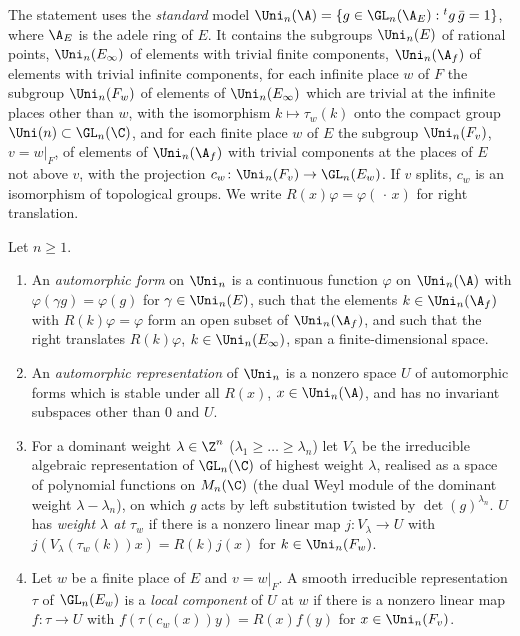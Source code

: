 The statement uses the \emph{standard} model $\Uni_n(\A)=\{g\in\GL_n(\A_E):{}^tg\,\bar g=1\}$, where $\A_E$ is
the adele ring of $E$. It contains the subgroups $\Uni_n(E)$ of rational points, $\Uni_n(E_\infty)$ of
elements with trivial finite components, $\Uni_n(\A_f)$ of elements with trivial infinite components,
for each infinite place $w$ of $F$ the subgroup $\Uni_n(F_w)$ of elements of $\Uni_n(E_\infty)$ which are
trivial at the infinite places other than $w$, with the isomorphism $k\mapsto\tau_w(k)$ onto the compact
group $\Uni(n)\subset\GL_n(\C)$, and for each finite place $w$ of $E$ the subgroup $\Uni_n(F_v)$,
$v=w|_F$, of elements of $\Uni_n(\A_f)$ with trivial components at the places of $E$ not above $v$, with
the projection $c_w\colon\Uni_n(F_v)\to\GL_n(E_w)$. If $v$ splits, $c_w$ is an isomorphism of
topological groups. We write $R(x)\varphi=\varphi(\,\cdot\,x)$ for right translation.

\begin{definition}\label{pf:tlift:aut}
Let $n\ge1$.
\begin{enumerate}[label=(\alph*),nosep]
\item An \emph{automorphic form} on $\Uni_n$ is a continuous function $\varphi$ on $\Uni_n(\A)$ with
  $\varphi(\gamma g)=\varphi(g)$ for $\gamma\in\Uni_n(E)$, such that the elements $k\in\Uni_n(\A_f)$ with
  $R(k)\varphi=\varphi$ form an open subset of $\Uni_n(\A_f)$, and such that the right translates
  $R(k)\varphi$, $k\in\Uni_n(E_\infty)$, span a finite-dimensional space.
\item An \emph{automorphic representation} of $\Uni_n$ is a nonzero space $U$ of automorphic forms which
  is stable under all $R(x)$, $x\in\Uni_n(\A)$, and has no invariant subspaces other than $0$ and $U$.
\item For a dominant weight $\lambda\in\Z^n$ ($\lambda_1\ge\dots\ge\lambda_n$) let $V_\lambda$ be the
  irreducible algebraic representation of $\GL_n(\C)$ of highest weight $\lambda$, realised as a
  space of polynomial functions on $M_n(\C)$ (the dual Weyl module of the dominant weight
  $\lambda-\lambda_n$), on which $g$ acts by left substitution twisted by $\det(g)^{\lambda_n}$.
  $U$ has \emph{weight $\lambda$ at $\tau_w$} if there is a
  nonzero linear map $j\colon V_\lambda\to U$ with $j(V_\lambda(\tau_w(k))x)=R(k)j(x)$ for
  $k\in\Uni_n(F_w)$.
\item Let $w$ be a finite place of $E$ and $v=w|_F$. A smooth irreducible representation $\tau$ of
  $\GL_n(E_w)$ is a \emph{local component} of $U$ at $w$ if there is a nonzero linear map
  $f\colon\tau\to U$ with $f(\tau(c_w(x))y)=R(x)f(y)$ for $x\in\Uni_n(F_v)$.
\end{enumerate}
\end{definition}

